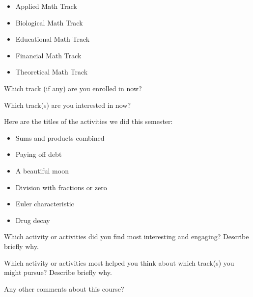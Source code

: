 \documentclass[handout,nooutcomes,space]{ximera}
\begin{document}
\begin{itemize}
\item Applied Math Track
\item Biological Math Track
\item Educational Math Track
\item Financial Math Track
\item Theoretical Math Track
\end{itemize}



\begin{question}
Which track (if any) are you enrolled in now?  
\begin{freeResponse}
\end{freeResponse}
\end{question}

\begin{question}
Which track(s) are you interested in now? 
\begin{freeResponse}
\end{freeResponse}
\end{question}

Here are the titles of the activities we did this semester:  

\begin{multicols}{2}
\begin{itemize}
\item Sums and products combined 
\item Paying off debt
\item A beautiful moon 
\item Division with fractions or zero
\item Euler characteristic 
\item Drug decay
\end{itemize}
\end{multicols}

\begin{question}[1.5in]
Which activity or activities did you find most interesting and engaging?  Describe briefly why.  
\begin{freeResponse}
\end{freeResponse}
\end{question}


\begin{question}[1.5in]
Which activity or activities most helped you think about which track(s) you might pursue?  Describe briefly why.  
\begin{freeResponse}
\end{freeResponse}
\end{question}

\begin{question}
Any other comments about this course?  
\begin{freeResponse}
\end{freeResponse}
\end{question}
\end{document}
